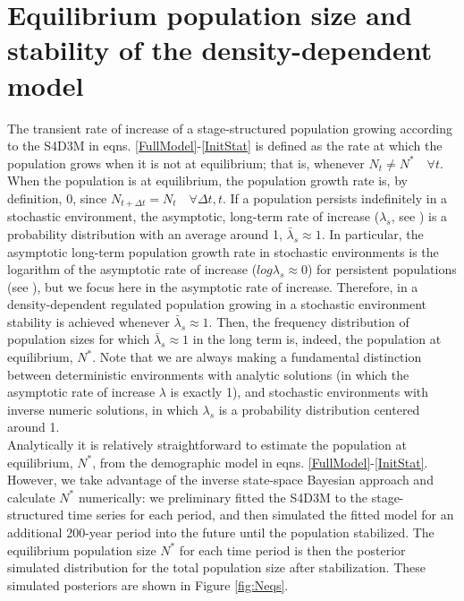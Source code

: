 \documentclass[12pt,a4paper]{article}
\begin{document}
\section{Equilibrium population size and stability of the density-dependent model}

The transient rate of increase of a stage-structured population growing according to the S4D3M in eqns. \ref{FullModel}-\ref{InitStat} is defined as the rate at which the population grows when it is not at equilibrium; that is, whenever $N_{t} \neq N^* \quad \forall t$. When the population is at equilibrium, the population growth rate is, by definition, 0, since $N_{t + \Delta t} = N_{t} \quad \forall \Delta t, t$. If a population persists indefinitely in a stochastic environment, the asymptotic, long-term rate of increase ($\lambda_{s}$, see \cite{Caswell2001}) is a probability distribution with an average around 1, $\bar \lambda_{s} \approx 1$. In particular, the asymptotic long-term population growth rate in stochastic environments is the logarithm of the asymptotic rate of increase ($log \lambda_{s} \approx 0$) for persistent populations (see \cite{Caswell2010,Caswell2019}), but we focus here in the asymptotic rate of increase. Therefore, in a density-dependent regulated population growing in a stochastic environment stability is achieved whenever $\bar \lambda_{s} \approx 1$. Then, the frequency distribution of population sizes for which $\bar \lambda_{s} \approx 1$ in the long term is, indeed, the population at equilibrium, $N^*$. Note that we are always making a fundamental distinction between deterministic environments with analytic solutions (in which the asymptotic rate of increase $\lambda$ is exactly 1), and stochastic environments with inverse numeric solutions, in which $\lambda_{s}$ is a probability distribution centered around 1. \\

Analytically it is relatively straightforward to estimate the population at equilibrium, $N^*$, from the demographic model in eqns. \ref{FullModel}-\ref{InitStat}. However, we take advantage of the inverse state-space Bayesian approach and calculate $N^*$ numerically: we preliminary fitted the S4D3M to the stage-structured time series for each period, and then simulated the fitted model for an additional 200-year period into the future until the population stabilized. The equilibrium population size $N^*$ for each time period is then the posterior simulated distribution for the total population size after stabilization. These simulated posteriors are shown in Figure \ref{fig:Neqs}.\\
\end{document}
